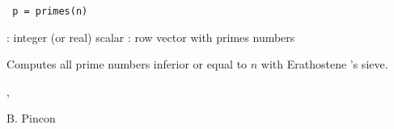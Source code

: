 
\begin{mandesc}
\end{mandesc}

\begin{calling_sequence}
\begin{verbatim}
 p = primes(n)
\end{verbatim}
\end{calling_sequence}

\begin{parameters}
  \begin{varlist}
   : integer (or real) scalar
   : row vector with primes numbers
  \end{varlist}
\end{parameters}

\begin{mandescription}
  Computes all prime numbers inferior or equal to $n$ with 
  Erathostene 's sieve.
\end{mandescription}

\begin{examples}
\begin{program}
\end{program}
\end{examples}


\begin{manseealso}
, 
\end{manseealso}

\begin{authors}
B. Pincon
\end{authors}

